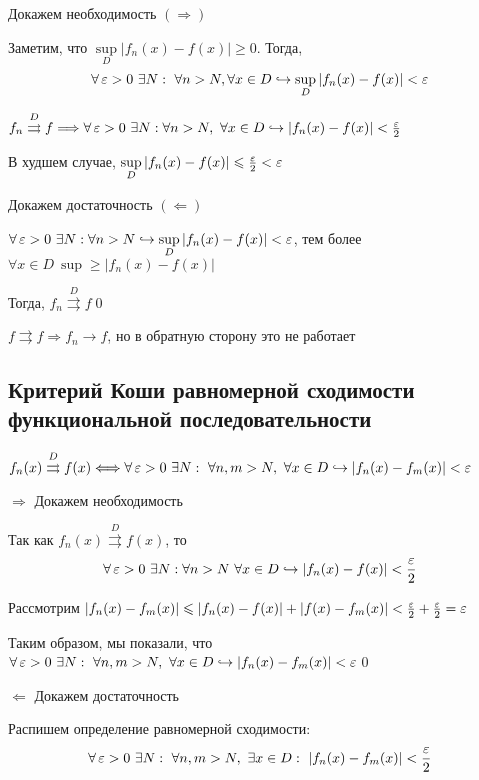 \documentclass[a4paper]{article}
\begin{document}
\proof Докажем необходимость $(\Longrightarrow)$

Заметим, что $\sup\limits_{D} \left|f_n(x)-f(x)\right|\geqslant 0$. Тогда,
\begin{equation*}
    \forall\ve >0\ \exists N:\ \forall n>N,\forall x\in D\hookrightarrow \sup\limits_D |f_n(x)-f(x)|<\ve
\end{equation*}

$f_n\overset{D}{\rightrightarrows} f\Longrightarrow \forall\operatorname{\varepsilon}>0\ \exists N:\forall n>N,\ \forall x\in D\hookrightarrow|f_n(x)-f(x)|<\frac{\operatorname{\varepsilon}}{2}$

В худшем случае, $\sup\limits_{D} |f_n(x)-f(x)|\leqslant \frac{\operatorname{\varepsilon}}{2}<\operatorname{\varepsilon}$

\proof Докажем достаточность $(\Longleftarrow)$

$\forall \operatorname{\varepsilon}>0\ \exists N:\forall n>N\hookrightarrow\sup\limits_{D}|f_n(x)-f(x)|<\operatorname{\varepsilon}$, тем более $\forall x\in D\ \sup \geqslant |f_n(x)-f(x)|$ 

Тогда, $f_n\overset{D}{\rightrightarrows} f$\qed 

\comment $f\rightrightarrows f\Longrightarrow f_n\longrightarrow f$, но в обратную сторону это не работает


\subsection{Критерий Коши равномерной сходимости функциональной последовательности}
\theorem $f_n(x)\overset{D}{\rightrightarrows} f(x)\Longleftrightarrow\forall\ve>0\ \exists N:\ \forall n,m>N,\ \forall x\in D\hookrightarrow |f_n(x)-f_m(x)|<\ve$

\proof $\Longrightarrow$ Докажем необходимость

Так как $f_n(x)\overset{D}{\rightrightarrows} f(x)$, то
\begin{equation*}
    \forall\operatorname{\varepsilon}>0\ \exists N:\forall n>N\ \forall x\in D\hookrightarrow |f_n(x)-f(x)|<\frac{\operatorname{\varepsilon}}{2}
\end{equation*}

Рассмотрим $|f_n(x)-f_m(x)|\leqslant |f_n(x)-f(x)|+|f(x)-f_m(x)|<\frac{\operatorname{\varepsilon}}{2}+\frac{\operatorname{\varepsilon}}{2}=\operatorname{\varepsilon}$

Таким образом, мы показали, что $\forall\ve>0\ \exists N:\ \forall n,m>N,\ \forall x\in D\hookrightarrow |f_n(x)-f_m(x)|<\ve$\qed

\proof $\Longleftarrow$ Докажем достаточность

Распишем определение равномерной сходимости:
\begin{equation*}
    \forall\ve>0\ \exists N:\ \forall n,m>N,\ \exists x\in D:\ |f_n(x)-f_m(x)|<\frac{\ve}{2}
\end{equation*}
\end{document}
